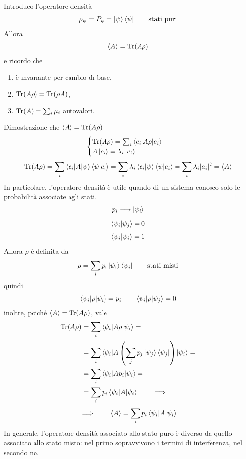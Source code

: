 \bigskip
\noindent
Introduco l'operatore densità
\[
\rho_\psi = P_\psi = \ket{\psi}\bra{\psi} \qquad \text{stati puri}
\]
Allora
\[
\braket{A} = \operatorname{Tr}(A\rho)
\]
e ricordo che
\begin{enumerate}
\item è invariante per cambio di base,
\item \(\operatorname{Tr}(A\rho) = \operatorname{Tr}(\rho A)\),
\item \(\operatorname{Tr}(A) = \sum_i \mu_i\) autovalori.
\end{enumerate}
Dimostrazione che \(\braket{A} = \operatorname{Tr}(A\rho)\)
\[
\begin{cases}
\operatorname{Tr}(A\rho) = \sum_i \braket{e_i|A\rho|e_i} \\
A \ket{e_i} = \lambda_i \ket{e_i}
\end{cases}
\]
\[
\operatorname{Tr}(A\rho) = \sum_i \braket{e_i|A|\psi} \braket{\psi|e_i} = \sum_i \lambda_i \braket{e_i|\psi} \braket{\psi|e_i} = \sum_i \lambda_i |a_i|^2 = \braket{A}
\]
In particolare, l'operatore densità è utile quando di un sistema conosco solo le probabilità associate agli stati.
\[
p_i \longrightarrow \ket{\psi_i}
\]
\[
\braket{\psi_i|\psi_j} = 0
\]
\[
\braket{\psi_i|\psi_i} = 1
\]
Allora \(\rho\) è definita da
\[
\rho = \sum_i p_i \ket{\psi_i} \bra{\psi_i} \qquad \text{stati misti}
\]
quindi
\[
\braket{\psi_i|\rho|\psi_i} = p_i \qquad \braket{\psi_i|\rho|\psi_j} = 0
\]
inoltre, poiché \(\braket{A} = \operatorname{Tr}(A\rho)\), vale
\begin{align*}
\operatorname{Tr}(A\rho) &= \sum_i \braket{\psi_i|A\rho|\psi_i} = \\
&= \sum_i \braket{\psi_i|A \left( \sum_j p_j \ket{\psi_j} \bra{\psi_j} \right)|\psi_i} = \\
&= \sum_i \braket{\psi_i|A p_i|\psi_i} = \\
&= \sum_i p_i \braket{\psi_i|A|\psi_i} \qquad \implies
\end{align*}
\[
\implies \qquad \braket{A} = \sum_i p_i \braket{\psi_i|A|\psi_i}
\]
In generale, l'operatore densità associato allo stato puro  è diverso da quello associato allo stato misto: nel primo sopravvivono i termini di interferenza, nel secondo no.


